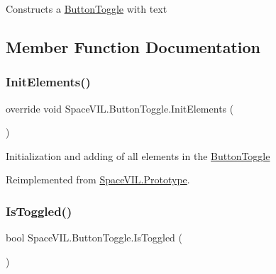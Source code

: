 Constructs a \mbox{\hyperlink{class_space_v_i_l_1_1_button_toggle}{Button\+Toggle}} with text 



\subsection{Member Function Documentation}
\mbox{\label{class_space_v_i_l_1_1_button_toggle_a5e2e938da7e38f0a6378fee26af5a75b}} 
\subsubsection{\texorpdfstring{Init\+Elements()}{InitElements()}}
{\footnotesize\ttfamily override void Space\+V\+I\+L.\+Button\+Toggle.\+Init\+Elements (\begin{DoxyParamCaption}{ }\end{DoxyParamCaption})\hspace{0.3cm}{\ttfamily [virtual]}}



Initialization and adding of all elements in the \mbox{\hyperlink{class_space_v_i_l_1_1_button_toggle}{Button\+Toggle}} 



Reimplemented from \mbox{\hyperlink{class_space_v_i_l_1_1_prototype_ac3379fe02923ee155b5b0084abf27420}{Space\+V\+I\+L.\+Prototype}}.

\mbox{\label{class_space_v_i_l_1_1_button_toggle_acb981bafc054853c3c55d75f1602d157}} 
\subsubsection{\texorpdfstring{Is\+Toggled()}{IsToggled()}}
{\footnotesize\ttfamily bool Space\+V\+I\+L.\+Button\+Toggle.\+Is\+Toggled (\begin{DoxyParamCaption}{ }\end{DoxyParamCaption})}



